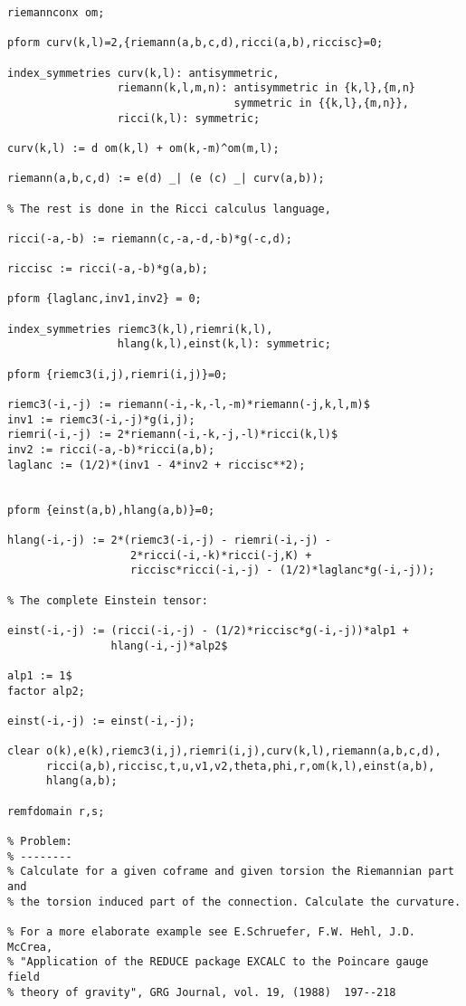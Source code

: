 {\begin{verbatim}
riemannconx om;

pform curv(k,l)=2,{riemann(a,b,c,d),ricci(a,b),riccisc}=0;

index_symmetries curv(k,l): antisymmetric,
                 riemann(k,l,m,n): antisymmetric in {k,l},{m,n}
                                   symmetric in {{k,l},{m,n}},
                 ricci(k,l): symmetric;

curv(k,l) := d om(k,l) + om(k,-m)^om(m,l);

riemann(a,b,c,d) := e(d) _| (e (c) _| curv(a,b));

% The rest is done in the Ricci calculus language,

ricci(-a,-b) := riemann(c,-a,-d,-b)*g(-c,d);

riccisc := ricci(-a,-b)*g(a,b);

pform {laglanc,inv1,inv2} = 0;

index_symmetries riemc3(k,l),riemri(k,l),
                 hlang(k,l),einst(k,l): symmetric;

pform {riemc3(i,j),riemri(i,j)}=0;

riemc3(-i,-j) := riemann(-i,-k,-l,-m)*riemann(-j,k,l,m)$
inv1 := riemc3(-i,-j)*g(i,j);
riemri(-i,-j) := 2*riemann(-i,-k,-j,-l)*ricci(k,l)$
inv2 := ricci(-a,-b)*ricci(a,b);
laglanc := (1/2)*(inv1 - 4*inv2 + riccisc**2);


pform {einst(a,b),hlang(a,b)}=0;

hlang(-i,-j) := 2*(riemc3(-i,-j) - riemri(-i,-j) -
                   2*ricci(-i,-k)*ricci(-j,K) +
                   riccisc*ricci(-i,-j) - (1/2)*laglanc*g(-i,-j));

% The complete Einstein tensor:

einst(-i,-j) := (ricci(-i,-j) - (1/2)*riccisc*g(-i,-j))*alp1 +
                hlang(-i,-j)*alp2$

alp1 := 1$
factor alp2;

einst(-i,-j) := einst(-i,-j);

clear o(k),e(k),riemc3(i,j),riemri(i,j),curv(k,l),riemann(a,b,c,d),
      ricci(a,b),riccisc,t,u,v1,v2,theta,phi,r,om(k,l),einst(a,b),
      hlang(a,b);

remfdomain r,s;

% Problem:
% --------
% Calculate for a given coframe and given torsion the Riemannian part and
% the torsion induced part of the connection. Calculate the curvature.

% For a more elaborate example see E.Schruefer, F.W. Hehl, J.D. McCrea,
% "Application of the REDUCE package EXCALC to the Poincare gauge field
% theory of gravity", GRG Journal, vol. 19, (1988)  197--218


\end{verbatim}}

